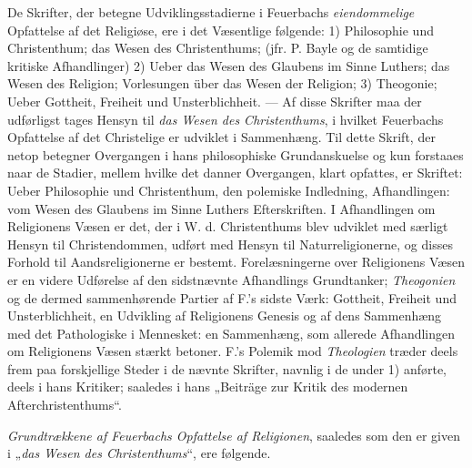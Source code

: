 De Skrifter, der betegne Udviklingsstadierne i Feuerbachs \emph{eiendommelige}
Opfattelse af det Religiøse, ere i det Væsentlige følgende: 1) Philosophie und
Christenthum; das Wesen des Christenthums; (jfr. P. Bayle og de samtidige
kritiske Afhandlinger) 2) Ueber das Wesen des Glaubens im Sinne Luthers; das
Wesen des Religion; Vorlesungen über das Wesen der Religion; 3) Theogonie;
Ueber Gottheit, Freiheit und Unsterblichheit. --- Af disse Skrifter maa der
udførligst tages Hensyn til \emph{das Wesen des Christenthums}, i hvilket
Feuerbachs Opfattelse af det Christelige er udviklet i Sammenhæng. Til dette
Skrift, der netop betegner Overgangen i hans philosophiske Grundanskuelse og
kun forstaaes naar de Stadier, mellem hvilke det danner Overgangen, klart
opfattes, er Skriftet: Ueber Philosophie und Christenthum, den polemiske
Indledning, Afhandlingen: vom Wesen des Glaubens im Sinne Luthers
Efterskriften. I Afhandlingen om Religionens Væsen er det, der i W. d.
Christenthums blev udviklet med særligt Hensyn til Christendommen, udført med
Hensyn til Naturreligionerne, og disses Forhold til Aandsreligionerne er
bestemt. Forelæsningerne over Religionens Væsen er en
 videre Udførelse af den sidstnævnte Afhandlings Grundtanker;
\emph{Theogonien} og de dermed sammenhørende Partier af F.'s sidste Værk:
Gottheit, Freiheit und Unsterblichheit, en Udvikling af Religionens Genesis og
af dens Sammenhæng med det Pathologiske i Mennesket: en Sammenhæng, som
allerede Afhandlingen om Religionens Væsen stærkt betoner. F.'s Polemik mod
\emph{Theologien} træder deels frem paa forskjellige Steder i de nævnte
Skrifter, navnlig i de under 1) anførte, deels i hans Kritiker; saaledes i hans
„Beiträge zur Kritik des modernen Afterchristenthums“.

\emph{Grundtrækkene af Feuerbachs Opfattelse af Religionen}, saaledes som den
er given i „\emph{das Wesen des Christenthums}“, ere følgende.

